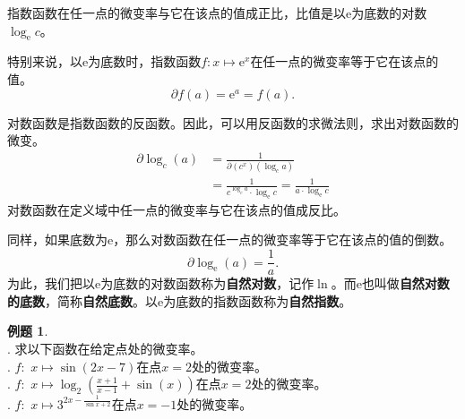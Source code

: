 \documentclass[12pt,UTF8]{ctexbook}
\theoremstyle{definition}
\newtheorem{et}{例题}[section]
\theoremstyle{plain}
\begin{document}
指数函数在任一点的微变率与它在该点的值成正比，比值是以$\mathrm{e}$为底数的对数$\log_{\mathrm{e}}{c}$。

特别来说，以$\mathrm{e}$为底数时，指数函数$f: x\mapsto \mathrm{e}^x$在任一点的微变率等于它在该点的值。
$$ \partial f (a) = \mathrm{e}^a = f(a).$$

对数函数是指数函数的反函数。因此，可以用反函数的求微法则，求出对数函数的微变。
\begin{align*}
    \partial \log_c (a) &= \frac{1}{\partial (c^x) (\log_c{a})}  \\
    &= \frac{1}{c^{\log_c{a}} \cdot \log_{\mathrm{e}}{c}} = \frac{1}{a \cdot \log_{\mathrm{e}}{c}}   
\end{align*}
对数函数在定义域中任一点的微变率与它在该点的值成反比。

同样，如果底数为$\mathrm{e}$，那么对数函数在任一点的微变率等于它在该点的值的倒数。
$$ \partial \log_{\mathrm{e}} (a) = \frac{1}{a}.$$
为此，我们把以$\mathrm{e}$为底数的对数函数称为\textbf{自然对数}，记作$\ln$。而$\mathrm{e}$也叫做\textbf{自然对数的底数}，简称\textbf{自然底数}。以$\mathrm{e}$为底数的指数函数称为\textbf{自然指数}。

\begin{et}
    \mbox{} \\
    . 求以下函数在给定点处的微变率。\\
    . $f: \,\, x \mapsto \sin{(2x - 7)}$在点$x = 2$处的微变率。\\
    . $f: \,\, x \mapsto \log_2{\left(\frac{x+1}{x-1} + \sin(x)\right)}$在点$x = 2$处的微变率。\\
    . $f: \,\, x \mapsto 3^{2x - \frac{1}{\sin{x} + 2}}$在点$x = -1$处的微变率。\\
\end{et}
\end{document}
